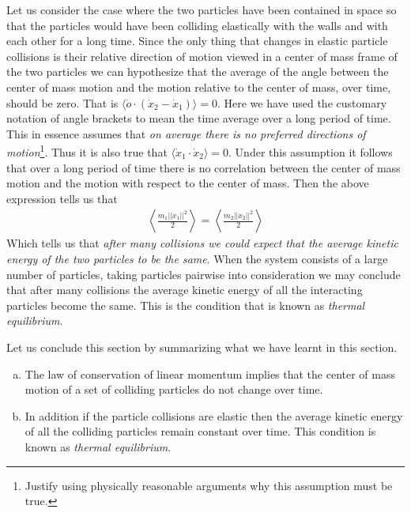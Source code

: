 \documentclass[graybox,envcountchap,sectrefs]{svmonoMuga}
\begin{document}
Let us consider the case where the two particles have been contained in space so that the particles would have been colliding elastically with the walls and with each other for a long time. Since the only thing that changes in elastic particle collisions is their relative direction of motion viewed in a center of mass frame of the two particles we can 
hypothesize that the average of the angle between the center of mass motion and the motion relative to the center of mass, over time, should be zero. That is $
\langle \dot{o}\cdot (\dot{x}_2-\dot{x}_1)\rangle =0$.
Here we have used the customary notation of angle brackets to mean the time average over a long period of time.
This in essence assumes that \textit{on average there is no preferred directions of motion}\footnote{Justify using physically reasonable arguments why this assumption must be true.}. Thus it is also true that $
\langle \dot{x}_1\cdot \dot{x}_2\rangle=0$.
Under this assumption it follows that over a long period of time there is no correlation between the center of mass motion and the motion with respect to the center of mass. Then the above expression tells us that
\begin{align}
\left\langle \frac{m_1||\dot{x}_1||^2}{2}\right\rangle
=\left\langle \frac{m_2||\dot{x}_2||^2}{2}\right\rangle
\end{align}
Which tells us that \textit{after many collisions we could expect that the average kinetic energy of the two particles to be the same}. When the system consists of a large number of particles, taking particles pairwise into consideration we may conclude that after many collisions the average kinetic energy of all the interacting particles become the same. This is the condition that is known as \textit{thermal equilibrium}.

Let us conclude this section by summarizing what we have learnt in this section.
\begin{svgraybox}
\begin{enumerate}[(a)]
\item The law of conservation of linear momentum implies that the center of mass motion of a set of colliding particles do not change over time. 
\item In addition if the particle collisions are elastic then the average kinetic energy of all the colliding particles remain constant over time. This condition is known as \textit{thermal equilibrium}. 
\end{enumerate}
\end{svgraybox}
\end{document}
